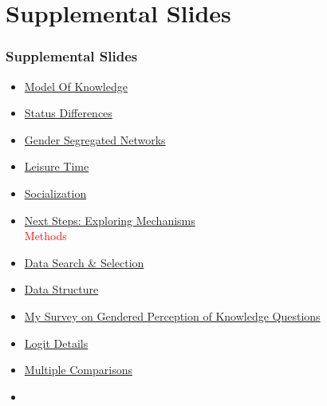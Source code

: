 \documentclass[pdf]{beamer}
\begin{document}
\section{Supplemental Slides}
\appendix


\begin{frame}
\frametitle{Supplemental Slides}
\label{supplemental_slides}
  \begin{itemize}
    \vspace{0.25cm} \\
    \hspace*{-.75cm}\textcolor{red}{Theory} \\
        \item
          \footnotesize{\hyperlink{model_of_knowledge}{Model Of Knowledge}}
        \item
          \footnotesize{\hyperlink{status_differences}{Status Differences}}
        \item
          \footnotesize{\hyperlink{gender_segregated_networks}{Gender Segregated Networks}}
        \item
          \footnotesize{\hyperlink{leisure_time}{Leisure Time}}
        \item
          \footnotesize{\hyperlink{socialization}{Socialization}}
        \item
          \footnotesize{\hyperlink{next_steps_exploring_mechanisms}{Next Steps: Exploring Mechanisms}}
    \vspace{0.25cm} \\
    \hspace*{-.75cm}\textcolor{red}{Methods} \\
        \item
          \footnotesize{\hyperlink{data_search_selection}{Data Search \& Selection}}
        \item
          \footnotesize{\hyperlink{data_structure}{Data Structure}}
        \item
          \footnotesize{\hyperlink{my_survey}{My Survey on Gendered Perception of Knowledge Questions}}
        \item
          \footnotesize{\hyperlink{logit_details}{Logit Details}}
        \item
          \footnotesize{\hyperlink{multiple_comparisons}{Multiple Comparisons}}
        \item

\end{itemize}
\end{frame}
\end{document}
